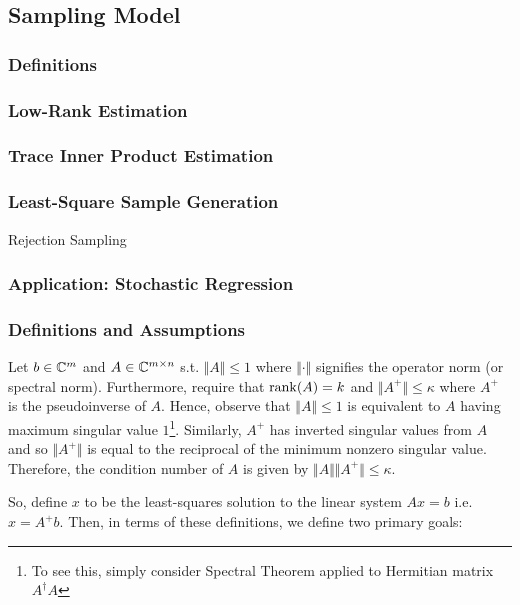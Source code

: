 \documentclass[main.tex]{subfiles}
\begin{document}
{\subsection{Sampling Model}

\subsubsection{Definitions}

\subsubsection{Low-Rank Estimation}

\subsubsection{Trace Inner Product Estimation}

\subsubsection{Least-Square Sample Generation}

Rejection Sampling

\subsubsection{Application: Stochastic Regression}

\subsubsection{Definitions and Assumptions}

Let $b \in \mathbb{C}^m$ and $A \in \mathbb{C}^{m \times n}$ s.t. $\Vert A \Vert \leq 1$ where $\Vert \cdot \Vert$ signifies the operator norm (or spectral norm). Furthermore, require that $\rank(A) = k$ and $\Vert A^+ \Vert \leq \kappa$ where $A^+$ is the pseudoinverse of $A$. Hence, observe that $\Vert A \Vert \leq 1$ is equivalent to $A$ having maximum singular value $1$\footnote{To see this, simply consider Spectral Theorem applied to Hermitian matrix $A^\dag A$}. Similarly, $A^+$ has inverted singular values from $A$ and so $\Vert A^+ \Vert$ is equal to the reciprocal of the minimum nonzero singular value. Therefore, the condition number of $A$ is given by $\Vert A \Vert \Vert A^+ \Vert \leq \kappa$.

So, define $x$ to be the least-squares solution to the linear system $Ax = b$ i.e. $x = A^+ b$. Then, in terms of these definitions, we define two primary goals:

}
\end{document}
